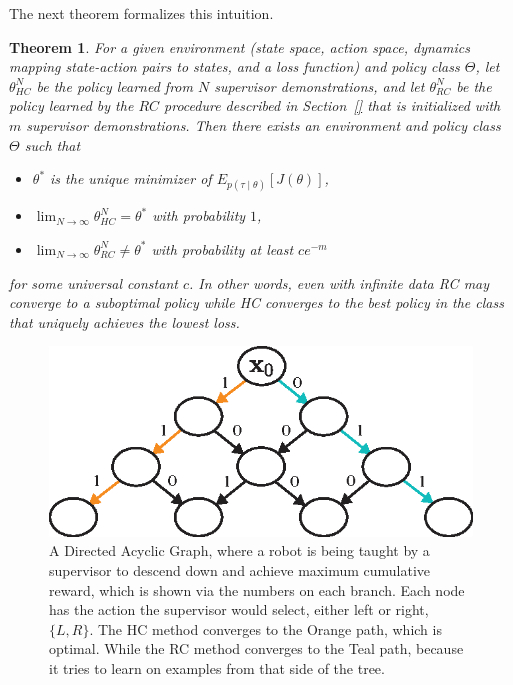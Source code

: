 \documentclass[10pt, conference]{ieeeconf}      %
\newtheorem{theorem}{Theorem}[section]
\begin{document}
The next theorem formalizes this intuition.


\begin{theorem}
For a given environment (state space, action space, dynamics mapping state-action pairs to states, and a loss function) and policy class $\Theta$,
let $\theta_{HC}^N$ be the policy learned from $N$ supervisor demonstrations,
and let $\theta_{RC}^N$ be the policy learned by the $RC$ procedure described in Section~\ref{} that is initialized with $m$ supervisor demonstrations.  
Then there exists an environment and policy class $\Theta$ such that 
\begin{itemize}
\item $\theta^*$ is the unique minimizer of $E_{p(\tau \mid \theta)}[ J( \theta ) ]$,
\item $\lim_{N \rightarrow \infty} \theta_{HC}^N = \theta^*$ with probability $1$,
\item $\lim_{N \rightarrow \infty} \theta_{RC}^N \neq \theta^*$ with probability at least $c e^{-m}$
\end{itemize}
for some universal constant $c$.
In other words, even with infinite data RC may converge to a suboptimal policy while HC converges to the best policy in the class that uniquely achieves the lowest loss.
\end{theorem}

\begin{figure}
\centering
\includegraphics{f_figs/counter_exmp.eps}
\caption{
    \footnotesize
A Directed Acyclic Graph, where a robot is being taught by a supervisor to descend down and achieve maximum cumulative reward, which is shown via the numbers on each branch. Each node has the action the supervisor would select, either left or right, $\lbrace L, R \rbrace$. The HC method converges to the Orange path, which is optimal. While the RC method converges to the Teal path, because it tries to learn on examples from that side of the tree.}
\vspace*{-20pt}
\label{fig:c_ex}
\end{figure}
\end{document}
